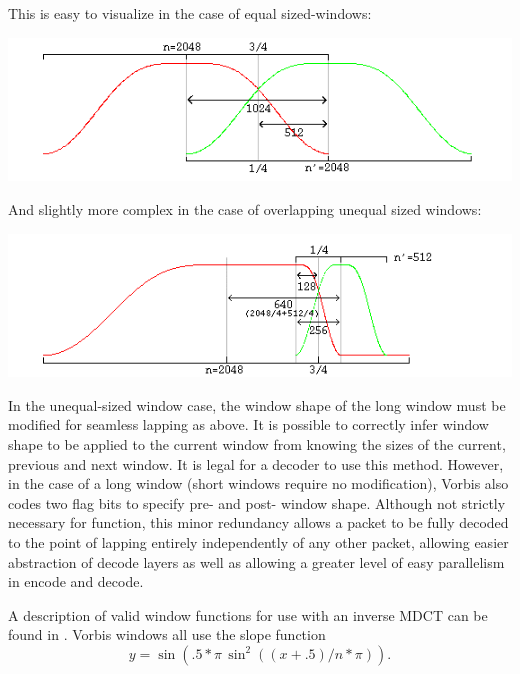 This is easy to visualize in the case of equal sized-windows:

\begin{center}
\includegraphics[width=\textwidth]{window1}
\end{center}

And slightly more complex in the case of overlapping unequal sized
windows:

\begin{center}
\includegraphics[width=\textwidth]{window2}
\end{center}

In the unequal-sized window case, the window shape of the long window
must be modified for seamless lapping as above.  It is possible to
correctly infer window shape to be applied to the current window from
knowing the sizes of the current, previous and next window.  It is
legal for a decoder to use this method. However, in the case of a long
window (short windows require no modification), Vorbis also codes two
flag bits to specify pre- and post- window shape.  Although not
strictly necessary for function, this minor redundancy allows a packet
to be fully decoded to the point of lapping entirely independently of
any other packet, allowing easier abstraction of decode layers as well
as allowing a greater level of easy parallelism in encode and
decode.

A description of valid window functions for use with an inverse MDCT
can be found in \cite{Sporer/Brandenburg/Edler}.  Vorbis windows
all use the slope function
\[ y = \sin(.5*\pi \, \sin^2((x+.5)/n*\pi)) . \]



